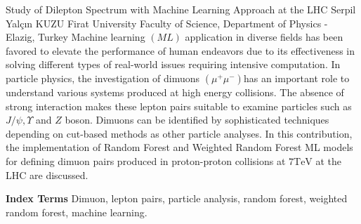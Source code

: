 
    \begin{abstract_online}{Study of Dilepton Spectrum with Machine Learning Approach at the LHC}{%
        Serpil Yalçın KUZU}{%
        }{%
        Firat University Faculty of Science, Department of Physics - Elazig, Turkey}
    Machine learning $(M L)$ application in diverse fields has been favored to elevate the performance of human endeavors due to its effectiveness in solving different types of real-world issues requiring intensive computation. In particle physics, the investigation of dimuons $\left(\mu^{+} \mu^{-}\right)$has an important role to understand various systems produced at high energy collisions. The absence of strong interaction makes these lepton pairs suitable to examine particles such as $J / \psi, \Upsilon$ and $Z$ boson. Dimuons can be identified by sophisticated techniques depending on cut-based methods as other particle analyses. In this contribution, the implementation of Random Forest and Weighted Random Forest ML models for defining dimuon pairs produced in proton-proton collisions at $7 \mathrm{TeV}$ at the LHC are discussed. 
    
            \textbf{Index Terms} \newline{}Dimuon, lepton pairs, particle analysis, random forest, weighted random forest, machine learning.
    \end{abstract_online}
    